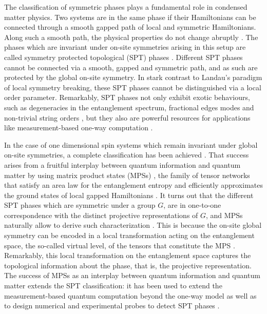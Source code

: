 \documentclass[a4paper,twocolumn,11pt,accepted=2023-02-10]{quantumarticle}
\begin{document}
The classification of symmetric phases plays a fundamental role in condensed matter physics. Two systems are in the same phase if their Hamiltonians can be connected through a smooth gapped path of local and symmetric Hamiltonians. Along such a smooth path, the physical properties do not change abruptly \cite{Hastings05}. The phases which are invariant under on-site symmetries arising in this setup are called symmetry protected topological (SPT) phases \cite{Pollmann12prot}. Different SPT phases cannot be connected via a smooth, gapped and symmetric path, and as such are protected by the global on-site symmetry. In stark contrast to Landau's paradigm of local symmetry breaking, these SPT phases cannot be distinguished via a local order parameter. Remarkably, SPT phases not only exhibit exotic behaviours, such as degeneracies in the entanglement spectrum, fractional edges modes and non-trivial string orders \cite{Pollmann10}, but they also are powerful resources for applications like measurement-based one-way computation \cite{Raussendorf01}.

In the case of one dimensional spin systems which remain invariant under global on-site symmetries, a complete classification has been achieved \cite{Chen11,Schuch11,ogata2021classification}. 
That success arises from a fruitful interplay between quantum information and quantum matter by using matrix product states (MPSs) \cite{Fannes92,PerezGarcia07}, the family of tensor networks that satisfy an area law for the entanglement entropy and efficiently approximates the ground states of local gapped Hamiltonians \cite{Hastings07A,Hastings07B}. It turns out that the different SPT phases which are symmetric under a group $G$, are in one-to-one correspondence with the distinct projective representations of $G$, and MPSs naturally allow to derive such characterization \cite{Chen11}. This is because the on-site global symmetry can be encoded in a local transformation acting on the entanglement space, the so-called virtual level, of the tensors that constitute the MPS \cite{PerezGarcia07}. Remarkably, this local transformation on the entanglement space captures the topological information about the phase, that is, the projective representation. The success of MPSs as an interplay between quantum information and quantum matter extends the SPT classification: it has been used to extend the measurement-based quantum computation beyond the one-way model \cite{Gross07} as well as to design numerical and experimental probes to detect SPT phases \cite{Haegeman12,Pollmann12,Elben19}. 
\end{document}
